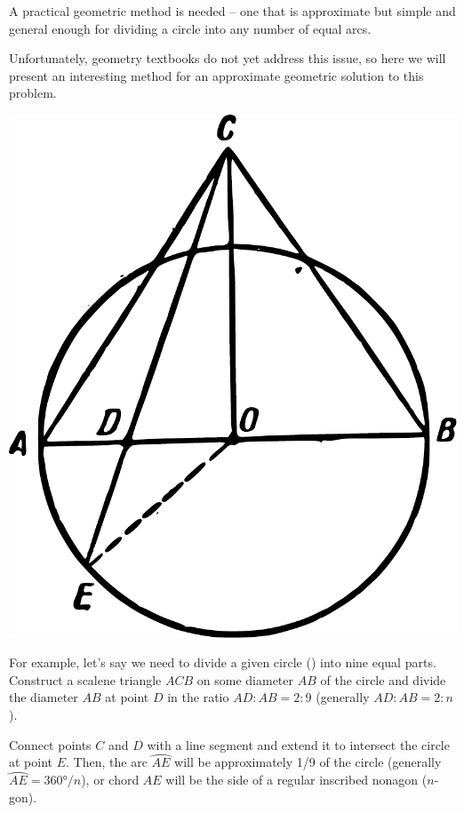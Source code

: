 A practical geometric method is needed -- one that is approximate but simple and general enough for dividing a circle into any number of equal arcs.

Unfortunately, geometry textbooks do not yet address this issue, so here we will present an interesting method for an approximate geometric solution to this problem.


\begin{marginfigure}%
\centering
\includegraphics[width=\textwidth]{figures/ch-10/fig-149.pdf}
\end{marginfigure}



For example, let's say we need to divide a given circle () into nine equal parts. Construct a scalene triangle $ACB$ on some diameter $AB$ of the circle and divide the diameter $AB$ at point $D$ in the ratio $AD:AB = 2:9$ (generally $AD:AB = 2:n$).

Connect points $C$ and $D$ with a line segment and extend it to intersect the circle at point $E$. Then, the arc $\wideparen{AE}$ will be approximately 1/9 of the circle (generally $\wideparen{AE} = \ang{360}/n$), or chord $AE$ will be the side of a regular inscribed nonagon ($n$-gon).

